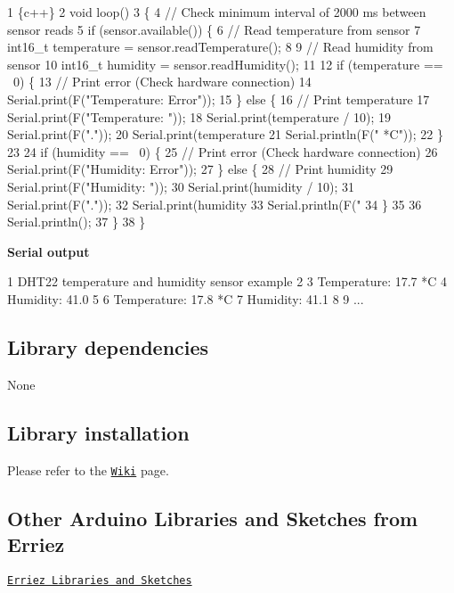 \begin{DoxyCode}
1 \{c++\}
2 void loop()
3 \{
4     // Check minimum interval of 2000 ms between sensor reads
5     if (sensor.available()) \{
6         // Read temperature from sensor
7         int16\_t temperature = sensor.readTemperature();
8 
9         // Read humidity from sensor
10         int16\_t humidity = sensor.readHumidity();
11 
12         if (temperature == ~0) \{
13             // Print error (Check hardware connection)
14             Serial.print(F("Temperature: Error"));
15         \} else \{
16             // Print temperature
17             Serial.print(F("Temperature: "));
18             Serial.print(temperature / 10);
19             Serial.print(F("."));
20             Serial.print(temperature %
21             Serial.println(F(" *C"));
22         \}
23 
24         if (humidity == ~0) \{
25             // Print error (Check hardware connection)
26             Serial.print(F("Humidity: Error"));
27         \} else \{
28             // Print humidity
29             Serial.print(F("Humidity: "));
30             Serial.print(humidity / 10);
31             Serial.print(F("."));
32             Serial.print(humidity %
33             Serial.println(F(" %
34         \}
35 
36         Serial.println();
37       \}
38 \}
\end{DoxyCode}


{\bfseries Serial output}


\begin{DoxyCode}
1 DHT22 temperature and humidity sensor example
2 
3 Temperature: 17.7 *C
4 Humidity: 41.0 %
5 
6 Temperature: 17.8 *C
7 Humidity: 41.1 %
8 
9 ...
\end{DoxyCode}


\subsection*{Library dependencies}


\begin{DoxyItemize}
\item None
\end{DoxyItemize}

\subsection*{Library installation}

Please refer to the \href{https://github.com/Erriez/ErriezArduinoLibrariesAndSketches/wiki}{\tt Wiki} page.

\subsection*{Other Arduino Libraries and Sketches from Erriez}


\begin{DoxyItemize}
\item \href{https://github.com/Erriez/ErriezArduinoLibrariesAndSketches}{\tt Erriez Libraries and Sketches} 
\end{DoxyItemize}